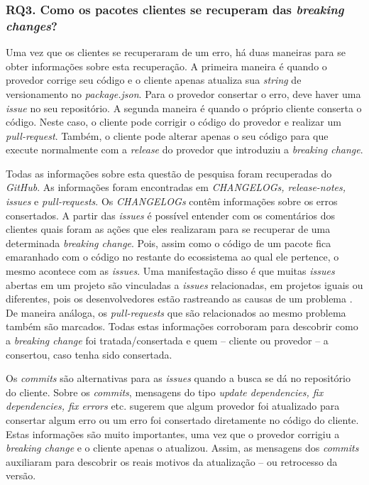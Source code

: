 \subsubsection{RQ3. Como os pacotes clientes se recuperam das \textit{breaking changes}?}
\label{apr:rq3}
Uma vez que os clientes se recuperaram de um erro, há duas maneiras para se obter informações sobre esta recuperação. A primeira maneira é quando o provedor corrige seu código e o cliente apenas atualiza sua \textit{string} de versionamento no \textit{package.json}. Para o provedor consertar o erro, deve haver uma \textit{issue} no seu repositório. A segunda maneira é quando o próprio cliente conserta o código. Neste caso, o cliente pode corrigir o código do provedor e realizar um \textit{pull-request}. Também, o cliente pode alterar apenas o seu código para que execute normalmente com a \textit{release} do provedor que introduziu a \textit{breaking change}.

Todas as informações sobre esta questão de pesquisa foram recuperadas do \textit{GitHub}. As informações foram encontradas em \textit{CHANGELOGs, release-notes, issues} e \textit{pull-requests}. Os \textit{CHANGELOGs} contêm informações sobre os erros consertados. A partir das \textit{issues} é possível entender com os comentários dos clientes quais foram as ações que eles realizaram para se recuperar de uma determinada \textit{breaking change}. Pois, assim como o código de um pacote fica emaranhado com o código no restante do ecossistema ao qual ele pertence, o mesmo acontece com as \textit{issues}. Uma manifestação disso é que muitas \textit{issues} abertas em um projeto são vinculadas a \textit{issues} relacionadas, em projetos iguais ou diferentes, pois os desenvolvedores estão rastreando as causas de um problema \cite{Zhang:2018:WIL:3242887.3242891}. De maneira análoga, os \textit{pull-requests} que são relacionados ao mesmo problema também são marcados. Todas estas informações corroboram para descobrir como a \textit{breaking change} foi tratada/consertada e quem -- cliente ou provedor -- a consertou, caso tenha sido consertada.

Os \textit{commits} são alternativas para as \textit{issues} quando a busca se dá no repositório do cliente. Sobre os \textit{commits}, mensagens do tipo \textit{update dependencies, fix dependencies, fix errors} etc. sugerem que algum provedor foi atualizado para consertar algum erro ou um erro foi consertado diretamente no código do cliente. Estas informações são muito importantes, uma vez que o provedor corrigiu a \textit{breaking change} e o cliente apenas o atualizou. Assim, as mensagens dos \textit{commits} auxiliaram para descobrir os reais motivos da atualização -- ou retrocesso da versão.

